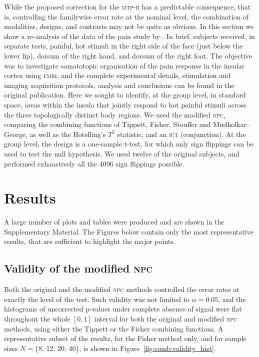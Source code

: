 While the proposed correction for the \textsc{mtp-ii} has a predictable consequence, that is, controlling the familywise error rate at the nominal level, the combination of modalities, designs, and contrasts may not be quite as obvious. In this section we show a re-analysis of the data of the pain study by \citet{Brooks2005}. In brief, subjects received, in separate tests, painful, hot stimuli in the right side of the face (just below the lower lip), dorsum of the right hand, and dorsum of the right foot. The objective was to investigate somatotopic organisation of the pain response in the insular cortex using \textsc{fmri}, and the complete experimental details, stimulation and imaging acquisition protocols, analysis and conclusions can be found in the original publication. Here we sought to identify, at the group level, in standard space, areas within the insula that jointly respond to hot painful stimuli across the three topologically distinct body regions. We used the modified \textsc{npc}, comparing the combining functions of Tippett, Fisher, Stouffer and Mudholkar--George, as well as the Hotelling's $T^2$ statistic, and an \textsc{iut} (conjunction). At the group level, the design is a one-sample t-test, for which only sign flippings can be used to test the null hypothesis. We used twelve of the original subjects, and performed exhaustively all the 4096 sign flippings possible.

\section{Results}

A large number of plots and tables were produced and are shown in the Supplementary Material. The Figures below contain only the most representative results, that are sufficient to highlight the major points.

\subsection{Validity of the modified \textsc{npc}}

Both the original and the modified \textsc{npc} methods controlled the error rates at exactly the level of the test. Such validity was not limited to $\alpha=0.05$, and the histograms of uncorrected p-values under complete absence of signal were flat throughout the whole $[0, 1]$ interval for both the original and modified \textsc{npc} methods, using either the Tippett or the Fisher combining functions. A representative subset of the results, for the Fisher method only, and for sample sizes $N = \{$8, 12, 20, 40$\}$, is shown in Figure~\ref{fig:comb:validity_hist}.

